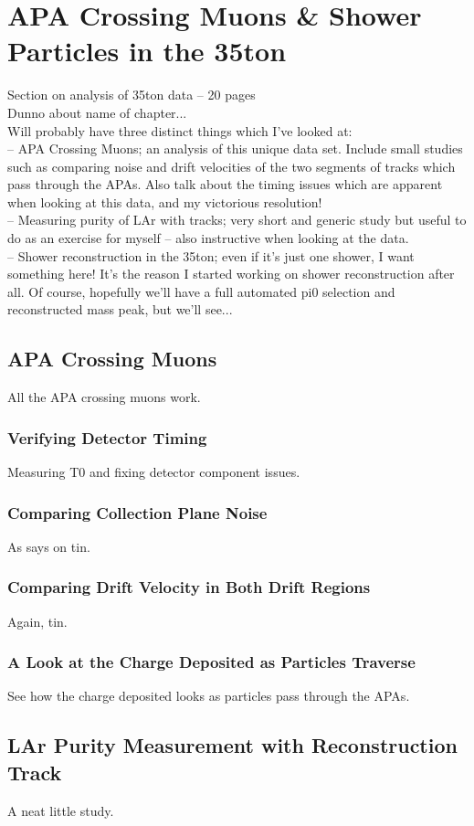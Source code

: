 \documentclass[a4paper,12pt]{report}
\begin{document}
\section{APA Crossing Muons \& Shower Particles in the 35ton}
Section on analysis of 35ton data -- 20 pages\\
Dunno about name of chapter...\\
Will probably have three distinct things which I've looked at:\\
-- APA Crossing Muons; an analysis of this unique data set. Include small studies such as comparing noise and drift velocities of the two segments of tracks which pass through the APAs. Also talk about the timing issues which are apparent when looking at this data, and my victorious resolution!\\
-- Measuring purity of LAr with tracks; very short and generic study but useful to do as an exercise for myself -- also instructive when looking at the data.\\
-- Shower reconstruction in the 35ton; even if it's just one shower, I want something here! It's the reason I started working on shower reconstruction after all. Of course, hopefully we'll have a full automated pi0 selection and reconstructed mass peak, but we'll see...
\subsection{APA Crossing Muons}
All the APA crossing muons work.
\subsubsection{Verifying Detector Timing}
Measuring T0 and fixing detector component issues.
\subsubsection{Comparing Collection Plane Noise}
As says on tin.
\subsubsection{Comparing Drift Velocity in Both Drift Regions}
Again, tin.
\subsubsection{A Look at the Charge Deposited as Particles Traverse}
See how the charge deposited looks as particles pass through the APAs.
\subsection{LAr Purity Measurement with Reconstruction Track}
A neat little study.
\end{document}
